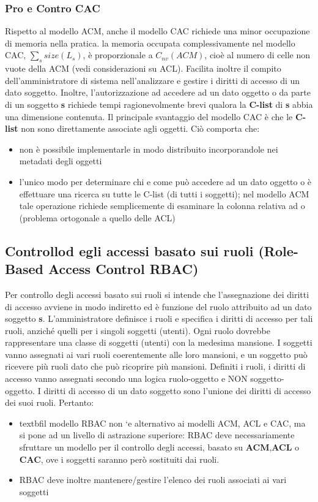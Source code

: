 \subsubsection{Pro e Contro CAC}
Rispetto al modello ACM, anche il modello CAC richiede una minor occupazione di memoria nella pratica. la memoria occupata complessivamente nel modello CAC,  $\sum_{s} size(L_{s})$, è proporzionale a $C_{nv} (ACM)$, cioè al numero di celle non vuote della ACM (vedi considerazioni su ACL). Facilita inoltre il compito dell'amministratore di sistema nell'analizzare e gestire i diritti di accesso di un dato soggetto. Inoltre, l'autorizzazione ad accedere ad un dato oggetto o da parte di un soggetto \textbf{s} richiede tempi ragionevolmente brevi qualora la \textbf{C-list} di \textbf{s} abbia una dimensione contenuta.\newline \newline
Il principale svantaggio del modello CAC è che le \textbf{C-list} non sono direttamente associate agli oggetti. Ciò comporta che:
\begin{itemize} 
  \item non è possibile implementarle in modo distribuito incorporandole nei metadati degli oggetti
  \item l'unico modo per determinare chi e come può accedere ad un dato oggetto o è effettuare una ricerca su tutte le C-list (di tutti i soggetti); nel modello ACM tale operazione richiede semplicemente di esaminare la colonna relativa ad o (problema ortogonale a quello delle ACL)
\end{itemize}

\subsection{Controllod egli accessi basato sui ruoli (Role-Based Access Control RBAC)}
Per controllo degli accessi basato sui ruoli si intende che l'assegnazione dei diritti di accesso avviene in modo indiretto ed è funzione del ruolo attribuito ad un dato soggetto \textbf{s}. L’amministratore definisce i ruoli e specifica i diritti di accesso per tali ruoli, anziché quelli per i singoli soggetti (utenti). Ogni ruolo dovrebbe rappresentare una classe di soggetti (utenti) con la medesima mansione. I soggetti vanno assegnati ai vari ruoli coerentemente alle loro mansioni, e un soggetto può ricevere più ruoli dato che può ricoprire più mansioni. Definiti i ruoli, i diritti di accesso vanno assegnati secondo una logica ruolo-oggetto e NON soggetto-oggetto. I diritti di accesso di un dato soggetto sono l’unione dei diritti di accesso dei suoi ruoli. Pertanto:
\begin{itemize} 
  \item textbf{il modello RBAC non `e alternativo ai modelli ACM, ACL e CAC, ma si pone ad un livello di astrazione superiore}: RBAC deve necessariamente sfruttare un modello per il controllo degli accessi, basato su \textbf{ACM},\textbf{ACL} o \textbf{CAC}, ove i soggetti saranno però sostituiti dai ruoli.
  \item RBAC deve inoltre mantenere/gestire l'elenco dei ruoli associati ai vari soggetti
\end{itemize}


